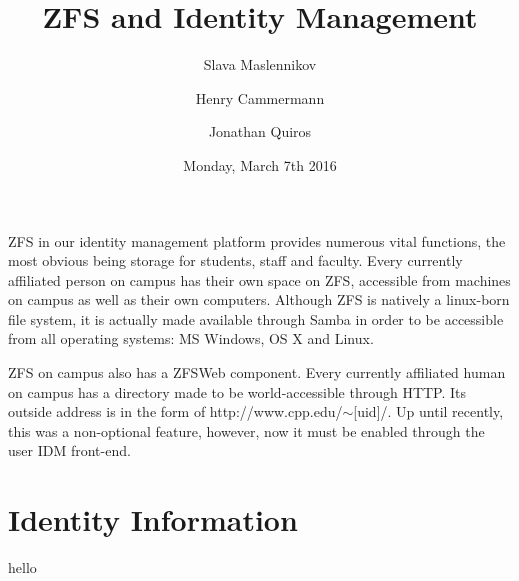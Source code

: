 \documentclass[letterpaper,12pt,titlepage]{article}
\title{ZFS and Identity Management}
\author{Slava Maslennikov \and Henry Cammermann \and Jonathan Quiros}
\date{Monday, March 7th 2016}
\begin{document}
\maketitle

%

ZFS in our identity management platform provides numerous vital functions, the most obvious being storage for students, staff and faculty. Every currently affiliated person on campus has their own space on ZFS, accessible from machines on campus as well as their own computers. Although ZFS is natively a linux-born file system, it is actually made available through Samba in order to be accessible from all operating systems: MS Windows, OS X and Linux. 

ZFS on campus also has a ZFSWeb component. Every currently affiliated human on campus has a directory made to be world-accessible through HTTP. Its outside address is in the form of http://www.cpp.edu/$\sim$[uid]/. Up until recently, this was a non-optional feature, however, now it must be enabled through the user IDM front-end. 


\section{Identity Information}
hello

%
%
%
\end{document}

